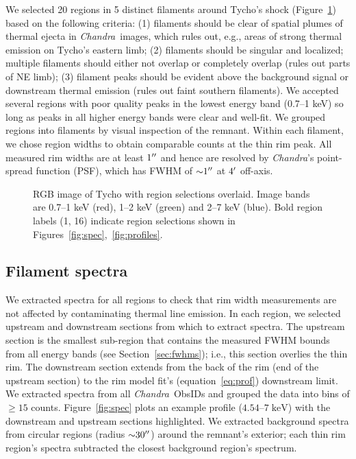 \documentclass[iop, apj, numberedappendix, twocolappendix]{emulateapj}
\newcommand*{\mt}{\mathrm}
\newcommand*{\unit}[1]{\;\mt{#1}}  %
\newcommand*{\abt}{\mathord{\sim}} %
\newcommand*{\Chandra}{\textit{Chandra}\ }
\begin{document}
We selected 20 regions in 5 distinct filaments around Tycho's shock
(Figure~\ref{fig:snr}) based on the following criteria: (1) filaments should be
clear of spatial plumes of thermal ejecta in \Chandra images, which rules out,
e.g., areas of strong thermal emission on Tycho's eastern limb; (2) filaments
should be singular and localized; multiple filaments should either not
overlap or completely overlap (rules out parts of NE limb); (3) filament
peaks should be evident above the background signal or downstream thermal
emission (rules out faint southern filaments).  We accepted several
regions with poor quality peaks in the lowest energy band (0.7--1 keV) so long
as peaks in all higher energy bands were clear and well-fit.
We grouped regions into filaments by visual inspection of the remnant.
Within each filament, we chose region widths to obtain comparable counts
at the thin rim peak.
All measured rim widths are at least $1\mbox{$^{\prime\prime}$}$ and hence are resolved by
\textit{Chandra}'s point-spread function (PSF), which has FWHM of
$\abt 1\arcsec$ at $4\mbox{$^\prime$}$ off-axis.

\begin{figure}
    \centering
    \caption{RGB image of Tycho with region selections overlaid.  Image bands
    are 0.7--1 keV (red), 1--2 keV (green) and 2--7 keV (blue).  Bold region
    labels (1, 16) indicate region selections shown in
    Figures~\ref{fig:spec},~\ref{fig:profiles}.
     \label{fig:snr}}
\end{figure}

\subsection{Filament spectra}
\label{sec:spec}

We extracted spectra for all regions to check that rim width measurements are
not affected by contaminating thermal line emission.  In each region, we
selected upstream and downstream sections from which to extract spectra.  The
upstream section is the smallest sub-region that contains the measured FWHM
bounds from all energy bands (see Section~\ref{sec:fwhms}); i.e., this section
overlies the thin rim.  The downstream section extends from the back of the rim
(end of the upstream section) to the rim model fit's (equation~\eqref{eq:prof})
downstream limit.  We extracted spectra from all \Chandra ObsIDs and grouped
the data into bins of $\geq 15$ counts.  Figure~\ref{fig:spec} plots an example
profile ($4.54$--$7 \unit{keV}$) with the downstream and upstream sections
highlighted.  We extracted background spectra from circular regions (radius
$\abt 30\arcsec$) around the remnant's exterior; each thin rim region's spectra
subtracted the closest background region's spectrum.
\end{document}
